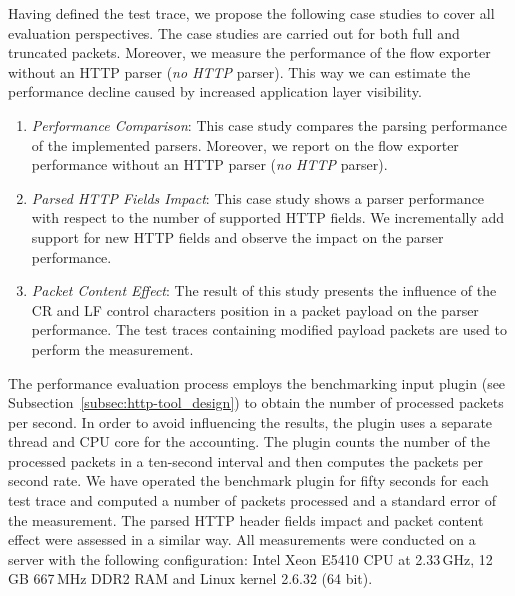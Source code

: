 
Having defined the test trace, we propose the following case studies to cover all evaluation perspectives. The case studies are carried out for both full and truncated packets. Moreover, we measure the performance of the flow exporter without an HTTP parser (\emph{no HTTP} parser). This way we can estimate the performance decline caused by increased application layer visibility.

\begin{enumerate}
    \item \emph{Performance Comparison}: This case study compares the parsing performance of the implemented parsers. Moreover, we report on the flow exporter performance without an HTTP parser (\emph{no HTTP} parser).
    \item \emph{Parsed HTTP Fields Impact}: This case study shows a parser performance with respect to the number of supported HTTP fields. We incrementally add support for new HTTP fields and observe the impact on the parser performance.
    \item \emph{Packet Content Effect}: The result of this study presents the influence of the CR and LF control characters position in a packet payload on the parser performance. The test traces containing modified payload packets are used to perform the measurement.
\end{enumerate}

The performance evaluation process employs the benchmarking input plugin (see Subsection~\ref{subsec:http-tool_design}) to obtain the number of processed packets per second. 
In order to avoid influencing the results, the plugin uses a separate thread and CPU core for the accounting. The plugin counts the number of the processed packets in a ten-second interval and then computes the packets per second rate. We have operated the benchmark plugin for fifty seconds for each test trace and computed a number of packets processed and a standard error of the measurement. The parsed HTTP header fields impact and packet content effect were assessed in a similar way. All measurements were conducted on a server with the following configuration: Intel Xeon E5410 CPU at 2.33\,GHz, 12\,GB 667\,MHz DDR2 RAM and Linux kernel 2.6.32 (64 bit).

